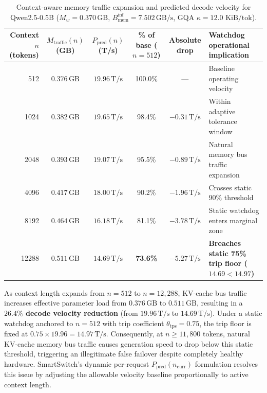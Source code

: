 \documentclass[11pt,a4paper]{article}
\newcommand{\Binf}{B_{\mathrm{mem}}^{\mathrm{inf}}}
\newcommand{\Ppred}{P_{\mathrm{pred}}}
\newcommand{\Ts}{\,\mathrm{T/s}}
\newcommand{\GBs}{\,\mathrm{GB/s}}
\newcommand{\GB}{\,\mathrm{GB}}
\begin{document}
\begin{table}[h]
\centering
\caption{Context-aware memory traffic expansion and predicted decode velocity for Qwen2.5-0.5B ($M_w = 0.370\GB$, $\Binf = 7.502\GBs$, GQA $\kappa = 12.0\text{ KiB/tok}$).}
\label{tab:kv_empirical}
\small
\begin{tabularx}{\linewidth}{@{}rCCCCL@{}}
\toprule
\textbf{Context $n$ (tokens)} & \textbf{$M_{\mathrm{traffic}}(n)$ (GB)} & \textbf{$\Ppred(n)$ (T/s)} & \textbf{\% of base ($n{=}512$)} & \textbf{Absolute drop} & \textbf{Watchdog operational implication} \\
   & $0.376\GB$ & $\mathbf{19.96}\Ts$ & 100.0\% & ---        & Baseline operating velocity \\
1024  & $0.382\GB$ & $\mathbf{19.65}\Ts$ &  98.4\% & $-0.31\Ts$ & Within adaptive tolerance window \\
2048  & $0.393\GB$ & $\mathbf{19.07}\Ts$ &  95.5\% & $-0.89\Ts$ & Natural memory bus traffic expansion \\
4096  & $0.417\GB$ & $\mathbf{18.00}\Ts$ &  90.2\% & $-1.96\Ts$ & Crosses static 90\% threshold \\
8192  & $0.464\GB$ & $\mathbf{16.18}\Ts$ &  81.1\% & $-3.78\Ts$ & Static watchdog enters marginal zone \\
12288 & $0.511\GB$ & $\mathbf{14.69}\Ts$ &  \textbf{73.6\%} & $-5.27\Ts$ & \textbf{\textcolor{red!70!black}{Breaches static 75\% trip floor ($14.69 < 14.97$)}} \\
\bottomrule
\end{tabularx}
\end{table}

\noindent As context length expands from $n=512$ to $n=12{,}288$, KV-cache bus traffic increases effective parameter load from $0.376\GB$ to $0.511\GB$, resulting in a \textbf{$26.4\%$ decode velocity reduction} (from $19.96\Ts$ to $14.69\Ts$). Under a static watchdog anchored to $n=512$ with trip coefficient $\theta_{\mathrm{tps}} = 0.75$, the trip floor is fixed at $0.75 \times 19.96 = 14.97\Ts$. Consequently, at $n \ge 11{,}800$ tokens, natural KV-cache memory bus traffic causes generation speed to drop below this static threshold, triggering an illegitimate false failover despite completely healthy hardware. SmartSwitch's dynamic per-request $\Ppred(n_{\mathrm{curr}})$ formulation resolves this issue by adjusting the allowable velocity baseline proportionally to active context length.
\end{document}
